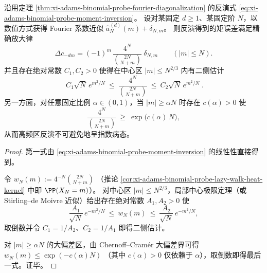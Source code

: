 \begin{theorem}\label{thm:xi-adams-binomial-probe-inversion-conditioning-phase-transition}
沿用定理 \ref{thm:xi-adams-binomial-probe-fourier-diagonalization} 的反演式 \eqref{eq:xi-adams-binomial-probe-moment-inversion}。
设对某固定 \(d\ge 1\)、某固定阶 \(N\)，以数值方式获得 Fourier 系数近似
\(
\widehat a_N^{(d)}(m)+\delta_{N,m}
\)。
则反演得到的矩误差满足精确放大律
\[
\boxed{\;
\Delta c_{-dm}
=(-1)^m\,\frac{4^N}{\binom{2N}{N+m}}\ \delta_{N,m}\qquad(|m|\le N).\;}
\]
并且存在绝对常数 \(C_1,C_2>0\) 使得在中心区 \(|m|\le N^{2/3}\) 内有二侧估计
\[
\boxed{\;
C_1\sqrt N\,e^{m^2/N}\ \le\ \frac{4^N}{\binom{2N}{N+m}}\ \le\ C_2\sqrt N\,e^{m^2/N}\; }.
\]
另一方面，对任意固定比例 \(\alpha\in(0,1)\)，当 \(|m|\ge \alpha N\) 时存在 \(c(\alpha)>0\) 使
\[
\boxed{\;
\frac{4^N}{\binom{2N}{N+m}}\ \ge\ \exp\bigl(c(\alpha)\,N\bigr),\;}
\]
从而高频区反演不可避免地呈指数病态。
\end{theorem}
\begin{proof}
第一式由 \eqref{eq:xi-adams-binomial-probe-moment-inversion} 的线性性直接得到。
\par
令
\(
w_N(m):=4^{-N}\binom{2N}{N+m}
\)
（推论 \ref{cor:xi-adams-binomial-probe-lazy-walk-heat-kernel} 中即 \(\PP(X_N=m)\)）。
对中心区 \(|m|\le N^{2/3}\)，局部中心极限定理（或 Stirling--de Moivre 近似）给出存在绝对常数 \(A_1,A_2>0\) 使
\[
\frac{A_1}{\sqrt N}\,e^{-m^2/N}\ \le\ w_N(m)\ \le\ \frac{A_2}{\sqrt N}\,e^{-m^2/N},
\]
取倒数并令 \(C_1=1/A_2\)、\(C_2=1/A_1\) 即得二侧估计。
\par
对 \(|m|\ge \alpha N\) 的大偏差区，由 Chernoff--Cram\'er 大偏差界可得
\(
w_N(m)\le \exp(-c(\alpha)N)
\)
（其中 \(c(\alpha)>0\) 仅依赖于 \(\alpha\)），取倒数即得最后一式。证毕。
\end{proof}

